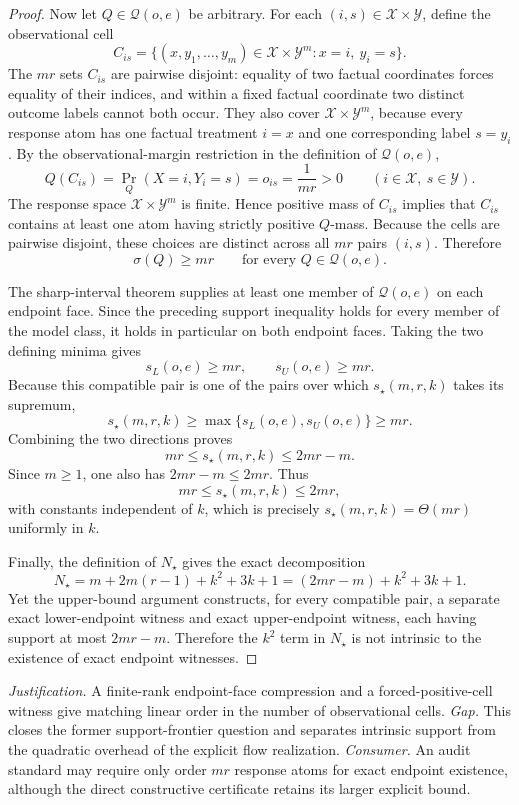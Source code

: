 \documentclass{article}
\begin{document}
\begin{proof}
Now let \(Q\in\mathcal Q(o,e)\) be arbitrary.  For each \((i,s)\in\mathcal X\times\mathcal Y\), define the observational cell
\[
 C_{is}
 =\{(x,y_1,\ldots,y_m)\in\mathcal X\times\mathcal Y^m:
       x=i,\ y_i=s\}.
\]
The \(mr\) sets \(C_{is}\) are pairwise disjoint: equality of two factual coordinates forces equality of their indices, and within a fixed factual coordinate two distinct outcome labels cannot both occur.  They also cover \(\mathcal X\times\mathcal Y^m\), because every response atom has one factual treatment \(i=x\) and one corresponding label \(s=y_i\).  By the observational-margin restriction in the definition of \(\mathcal Q(o,e)\),
\[
 Q(C_{is})
 =\Pr_Q(X=i,Y_i=s)
 =o_{is}
 =\frac1{mr}>0
 \qquad(i\in\mathcal X,\ s\in\mathcal Y).
\]
The response space \(\mathcal X\times\mathcal Y^m\) is finite.  Hence positive mass of \(C_{is}\) implies that \(C_{is}\) contains at least one atom having strictly positive \(Q\)-mass.  Because the cells are pairwise disjoint, these choices are distinct across all \(mr\) pairs \((i,s)\).  Therefore
\[
 \sigma(Q)\geq mr
 \qquad\text{for every }Q\in\mathcal Q(o,e).
\]

The sharp-interval theorem supplies at least one member of \(\mathcal Q(o,e)\) on each endpoint face.  Since the preceding support inequality holds for every member of the model class, it holds in particular on both endpoint faces.  Taking the two defining minima gives
\[
 s_L(o,e)\geq mr,
 \qquad
 s_U(o,e)\geq mr.
\]
Because this compatible pair is one of the pairs over which \(s_\star(m,r,k)\) takes its supremum,
\[
 s_\star(m,r,k)
 \geq\max\{s_L(o,e),s_U(o,e)\}
 \geq mr.
\]
Combining the two directions proves
\[
 mr\leq s_\star(m,r,k)\leq2mr-m.
\]
Since \(m\geq1\), one also has \(2mr-m\leq2mr\).  Thus
\[
 mr\leq s_\star(m,r,k)\leq2mr,
\]
with constants independent of \(k\), which is precisely \(s_\star(m,r,k)=\Theta(mr)\) uniformly in \(k\).

Finally, the definition of \(N_\star\) gives the exact decomposition
\[
 N_\star
 =m+2m(r-1)+k^2+3k+1
 =(2mr-m)+k^2+3k+1.
\]
Yet the upper-bound argument constructs, for every compatible pair, a separate exact lower-endpoint witness and exact upper-endpoint witness, each having support at most \(2mr-m\).  Therefore the \(k^2\) term in \(N_\star\) is not intrinsic to the existence of exact endpoint witnesses.
\end{proof}
\par\smallskip\noindent \textit{Justification.} A finite-rank endpoint-face compression and a forced-positive-cell witness give matching linear order in the number of observational cells. \textit{Gap.} This closes the former support-frontier question and separates intrinsic support from the quadratic overhead of the explicit flow realization. \textit{Consumer.} An audit standard may require only order \(mr\) response atoms for exact endpoint existence, although the direct constructive certificate retains its larger explicit bound.
\end{document}
